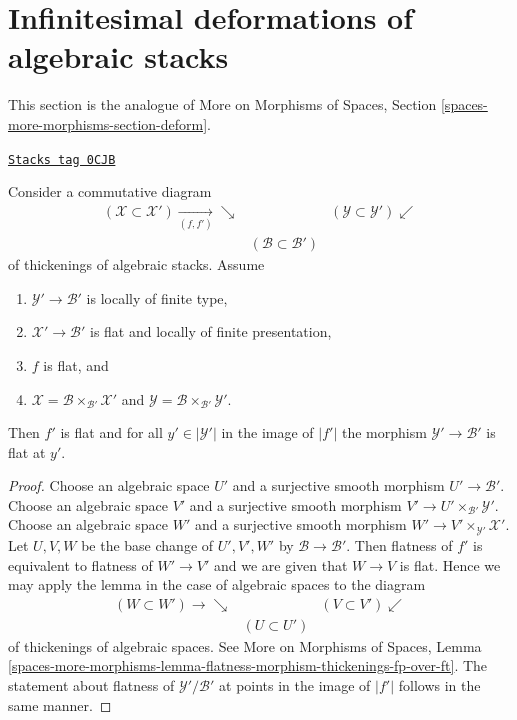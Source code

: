 \section{Infinitesimal deformations of algebraic stacks}
\label{stacks-more-morphisms-section-deform}
This section is the analogue of
More on Morphisms of Spaces, Section
\ref{spaces-more-morphisms-section-deform}.

\begin{lemma}
\label{stacks-more-morphisms-lemma-flatness-morphism-thickenings-fp-over-ft}
\href{https://stacks.math.columbia.edu/tag/0CJB}{\texttt{Stacks tag 0CJB}}

Consider a commutative diagram
$$
\begin{array}{ccc}(\mathcal{X} \subset \mathcal{X}') \underset{(f, f')}{\longrightarrow}\searrow &  & (\mathcal{Y} \subset \mathcal{Y}') \swarrow \\  & (\mathcal{B} \subset \mathcal{B}') & \end{array}
$$
of thickenings of algebraic stacks. Assume
\begin{enumerate}
\item $\mathcal{Y}' \to \mathcal{B}'$ is locally of finite type,
\item $\mathcal{X}' \to \mathcal{B}'$ is
flat and locally of finite presentation,
\item $f$ is flat, and
\item $\mathcal{X} = \mathcal{B} \times_{\mathcal{B}'} \mathcal{X}'$ and
$\mathcal{Y} = \mathcal{B} \times_{\mathcal{B}'} \mathcal{Y}'$.
\end{enumerate}
Then $f'$ is flat and for all $y' \in |\mathcal{Y}'|$ in the image of $|f'|$
the morphism $\mathcal{Y}' \to \mathcal{B}'$ is flat at $y'$.
\end{lemma}

\begin{proof}
Choose an algebraic space $U'$ and a surjective smooth morphism
$U' \to \mathcal{B}'$.
Choose an algebraic space $V'$ and a surjective smooth morphism
$V' \to U' \times_{\mathcal{B}'} \mathcal{Y}'$.
Choose an algebraic space $W'$ and a surjective smooth morphism
$W' \to V' \times_{\mathcal{Y}'} \mathcal{X}'$. Let $U, V, W$
be the base change of $U', V', W'$ by $\mathcal{B} \to \mathcal{B}'$.
Then flatness of $f'$ is equivalent to flatness of $W' \to V'$ and
we are given that $W \to V$ is flat. Hence we may apply the lemma
in the case of algebraic spaces to the diagram
$$
\begin{array}{ccc}(W \subset W') \longrightarrow\searrow &  & (V \subset V') \swarrow \\  & (U \subset U') & \end{array}
$$
of thickenings of algebraic spaces. See
More on Morphisms of Spaces, Lemma
\ref{spaces-more-morphisms-lemma-flatness-morphism-thickenings-fp-over-ft}.
The statement about flatness of $\mathcal{Y}'/\mathcal{B}'$ at points in the
image of $|f'|$ follows in the same manner.
\end{proof}

